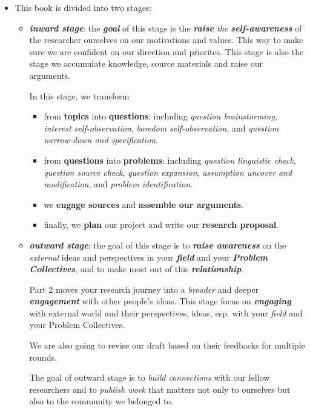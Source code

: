 \documentclass[11pt]{article}
\begin{document}
\begin{itemize}
\item This book is divided into two stages:
\begin{itemize}
\item \emph{\textbf{inward stage}}: the \emph{\textbf{goal}} of this stage is the \emph{\textbf{raise} the \textbf{self-awareness}} of the researcher ourselves on our motivations and values. This way to make sure we are confident on our direction and priorites. This stage is also the stage we accumulate knowledge, source materials and raise our arguments.

In this stage, we transform
\begin{itemize}
\item from \textbf{topics} into \textbf{questions}: including \emph{question brainstorming}, \emph{interest self-observation}, \emph{boredom self-observation}, and \emph{question narrow-down and specification}.

\item from \textbf{questions} into \textbf{problems}: including \emph{question linguistic check}, \emph{question source check}, \emph{question expansion}, \emph{assumption uncover and modification}, and \emph{problem identification}. 

\item we \textbf{engage sources} and \textbf{assemble our arguments}.
\item finally, we \textbf{plan} our project and write our \textbf{research proposal}.
\end{itemize}

\item \emph{\textbf{outward stage}}: the goal of this stage is to \emph{\textbf{raise awareness}} on the \emph{external} ideas and perspectives in your \emph{\textbf{field}} and your \emph{\textbf{Problem Collectives}}, and to make most out of this \emph{\textbf{relationship}}. 

Part 2 moves your research journey into a \emph{broader} and deeper \emph{\textbf{engagement}} with other people’s ideas.  This stage focus on \emph{\textbf{engaging}} with external world and their perspectives, ideas, esp. with your \emph{field} and your Problem Collectives. 

We are also going to revise our draft based on their feedbacks for multiple rounds. 

The goal of outward stage is to \emph{build connections} with our fellow researchers and to \emph{publish work} that matters not only to ourselves but also to the community we belonged to. 
\end{itemize}


\end{itemize}
\end{document}
